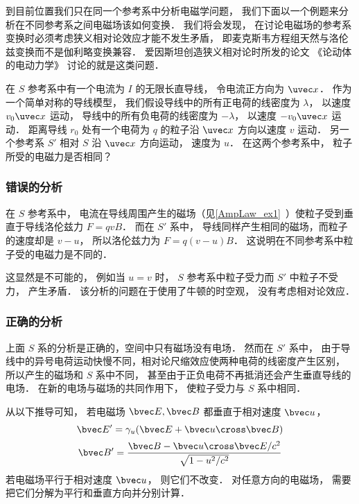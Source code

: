 
\begin{issues}
\issueDraft
\end{issues}


到目前位置我们只在同一个参考系中分析电磁学问题， 我们下面以一个例题来分析在不同参考系之间电磁场该如何变换． 我们将会发现， 在讨论电磁场的参考系变换时必须考虑狭义相对论效应才能不发生矛盾， 即麦克斯韦方程组天然与洛伦兹变换而不是伽利略变换兼容． 爱因斯坦创造狭义相对论时所发的论文 《论动体的电动力学》 讨论的就是这类问题．

在 $S$ 参考系中有一个电流为 $I$ 的无限长直导线， 令电流正方向为 $\uvec x$． 作为一个简单对称的导线模型， 我们假设导线中的所有正电荷的线密度为 $\lambda$， 以速度 $v_0\uvec x$ 运动， 导线中的所有负电荷的线密度为 $-\lambda$，  以速度 $-v_0\uvec x$ 运动． 距离导线 $r_0$ 处有一个电荷为 $q$ 的粒子沿 $\uvec x$ 方向以速度 $v$ 运动． 另一个参考系 $S'$ 相对 $S$ 沿 $\uvec x$ 方向运动， 速度为 $u$． 在这两个参考系中， 粒子所受的电磁力是否相同？

\subsubsection{错误的分析}
在 $S$ 参考系中， 电流在导线周围产生的磁场（见\autoref{AmpLaw_ex1}~）使粒子受到垂直于导线洛伦兹力 $F = qvB$． 而在 $S'$ 系中， 导线同样产生相同的磁场，而粒子的速度却是 $v - u$， 所以洛伦兹力为 $F = q(v-u)B$． 这说明在不同参考系中粒子受的电磁力是不同的．

这显然是不可能的， 例如当 $u = v$ 时， $S$ 参考系中粒子受力而 $S'$ 中粒子不受力， 产生矛盾． 该分析的问题在于使用了牛顿的时空观， 没有考虑相对论效应．

\subsubsection{正确的分析}
上面 $S$ 系的分析是正确的，空间中只有磁场没有电场． 然而在 $S'$ 系中， 由于导线中的异号电荷运动快慢不同，相对论尺缩效应使两种电荷的线密度产生区别， 所以产生的磁场和 $S$ 系中不同， 甚至由于正负电荷不再抵消还会产生垂直导线的电场． 在新的电场与磁场的共同作用下， 使粒子受力与 $S$ 系中相同．

从以下推导可知， 若电磁场 $\bvec E, \bvec B$ 都垂直于相对速度 $\bvec u$，%
\begin{equation}
\bvec E' = \gamma_u (\bvec E + \bvec u \cross \bvec B)
\end{equation}
\begin{equation}
\bvec B' = \frac{\bvec B - \bvec u \cross \bvec E/c^2}{\sqrt{1 - u^2/c^2}}
\end{equation}
若电磁场平行于相对速度 $\bvec u$， 则它们不改变． 对任意方向的电磁场， 需要把它们分解为平行和垂直方向并分别计算．

